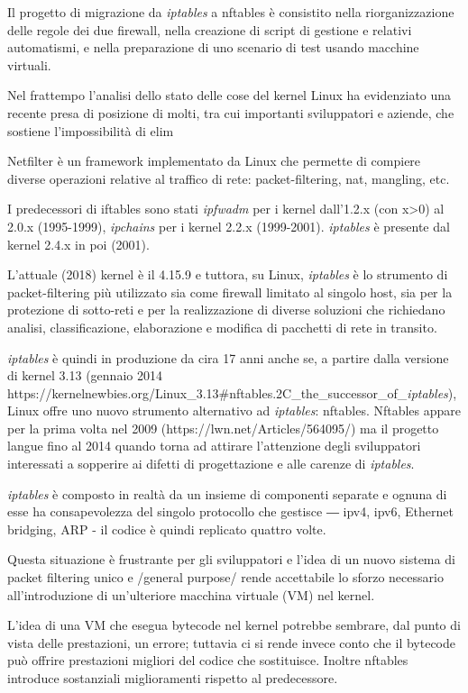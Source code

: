Il progetto di migrazione da {\em iptables} a nftables \`e consistito nella
riorganizzazione delle regole dei due firewall, nella creazione di script di
gestione e relativi automatismi, e nella preparazione di uno scenario di test
usando macchine virtuali.

Nel frattempo l'analisi dello stato delle cose del kernel Linux ha evidenziato
una recente presa di posizione di molti, tra cui importanti sviluppatori e
aziende, che sostiene l'impossibilit\`a di elim

Netfilter è un framework implementato da Linux che permette di
compiere diverse operazioni relative al traffico di rete: packet-filtering,
nat, mangling, etc.

I predecessori di iftables sono stati {\em ipfwadm} per i kernel dall'1.2.x (con x>0)
al 2.0.x (1995-1999), {\em ipchains} per i kernel 2.2.x (1999-2001).  {\em iptables} è
presente dal kernel 2.4.x in poi (2001).

L'attuale (2018) kernel è il 4.15.9 e tuttora, su Linux, {\em iptables} è lo
strumento di packet-filtering più utilizzato sia come firewall limitato al
singolo host, sia per la protezione di sotto-reti e per la realizzazione di
diverse soluzioni che richiedano analisi, classificazione, elaborazione e
modifica di pacchetti di rete in transito.

{\em iptables} è quindi in produzione da cira 17 anni anche se, a partire dalla
versione di kernel 3.13 (gennaio 2014
https://kernelnewbies.org/Linux\_3.13\#nftables.2C\_the\_successor\_of\_{\em iptables}),
Linux offre uno nuovo strumento alternativo ad {\em iptables}: nftables. Nftables
appare per la prima volta nel 2009 (https://lwn.net/Articles/564095/) ma il
progetto langue fino al 2014 quando torna ad attirare l'attenzione degli
sviluppatori interessati a sopperire ai difetti di progettazione e alle carenze
di {\em iptables}.

{\em iptables} è composto in realtà da un insieme di componenti separate e ognuna di
esse ha consapevolezza del singolo protocollo che gestisce ― ipv4, ipv6,
Ethernet bridging, ARP - il codice è quindi replicato quattro volte.

Questa situazione è frustrante per gli sviluppatori e l'idea di un nuovo
sistema di packet filtering unico e /general purpose/ rende accettabile lo
sforzo necessario all'introduzione di un'ulteriore macchina virtuale (VM) nel
kernel.

L'idea di una VM che esegua bytecode nel kernel potrebbe sembrare, dal punto di
vista delle prestazioni, un errore; tuttavia ci si rende invece conto che il
bytecode può offrire prestazioni migliori del codice che sostituisce.  Inoltre
nftables introduce sostanziali miglioramenti rispetto al predecessore.

